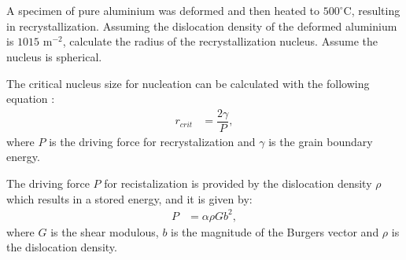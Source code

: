 \newpage
\section{}

A specimen of pure aluminium was deformed and then heated to $500^{\circ}$C, resulting in recrystallization. Assuming the dislocation density of the deformed aluminium is $1015$ m$^{-2}$, calculate the radius of the recrystallization nucleus. Assume the nucleus is spherical.

The critical nucleus size for nucleation can be calculated with the following equation \citet{rollett2017recrystallization}:
\begin{align}
    \label{eq:r_recrystallization}
    r_{crit}&=\dfrac{2\gamma}{P},
\end{align}
where $P$ is the driving force for recrystalization and $\gamma$ is the grain boundary energy.

The driving force $P$ for recistalization is provided by the dislocation density $\rho$ which results in a stored energy, and it is given by:
\begin{align}
    \label{eq:drivin_force}
    P&=\alpha \rho Gb^2,
\end{align}
where $G$ is the shear modulous, $b$ is the magnitude of the Burgers vector and $\rho$ is the dislocation density. 

